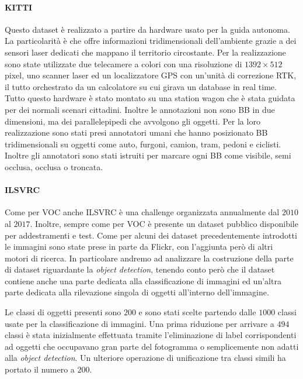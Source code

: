 \paragraph{KITTI}  \cite{geiger2012we} Questo dataset è realizzato a partire da hardware usato per la guida autonoma. La particolarità è che offre informazioni tridimensionali dell'ambiente grazie a dei sensori laser dedicati che mappano il territorio circostante. Per la realizzazione sono state  utilizzate due telecamere a colori con una risoluzione di $1392 \times 512$ pixel, uno scanner laser ed un localizzatore GPS con un'unità di correzione \ac{RTK}, il tutto orchestrato da un calcolatore su cui girava un database in real time.  Tutto questo hardware è stato montato su una station wagon che è stata guidata per dei normali scenari cittadini. 
Inoltre le annotazioni non sono \ac{BB} in due dimensioni, ma dei parallelepipedi che avvolgono gli oggetti. Per la loro realizzazione sono stati presi annotatori umani che hanno posizionato \ac{BB} tridimensionali su oggetti come auto, furgoni, camion, tram, pedoni e ciclisti. Inoltre gli annotatori sono stati istruiti per marcare ogni \ac{BB} come visibile, semi occlusa, occlusa o troncata. 



\paragraph{ILSVRC}
Come per \ac{VOC} anche \ac{ILSVRC} \cite{russakovsky2015imagenet} è una challenge organizzata annualmente dal $2010$ al $2017$. Inoltre, sempre come per \ac{VOC} è presente un dataset pubblico disponibile per addestramenti e test. 
Come per alcuni dei dataset precedentemente introdotti le immagini sono state prese in parte da Flickr, con l'aggiunta però di altri motori di ricerca. In particolare andremo ad analizzare la costruzione della parte di dataset riguardante la \textit{object detection}, tenendo conto però che il dataset contiene anche una parte dedicata alla classificazione di immagini ed un'altra parte dedicata alla rilevazione singola di oggetti all'interno dell'immagine. 

Le classi di oggetti presenti sono $200$ e sono stati scelte partendo dalle $1000$ classi usate per la classificazione di immagini. Una prima riduzione per arrivare a $494$ classi è stata inizialmente effettuata tramite l'eliminazione di label corrispondenti ad oggetti che occupavano gran parte del fotogramma o semplicemente non adatti alla \textit{object detection}. Un ulteriore operazione di unificazione tra classi simili ha portato il numero a $200$. 

